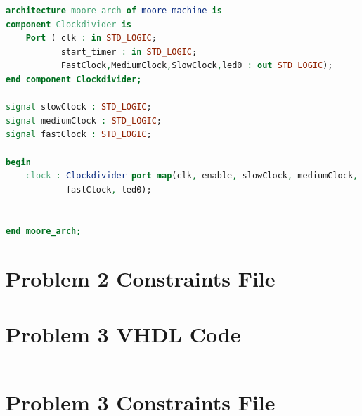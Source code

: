 \documentclass[11pt]{article}
\begin{document}
\begin{appendices}
\begin{lstlisting}[language=VHDL]
architecture moore_arch of moore_machine is
component Clockdivider is
    Port ( clk : in STD_LOGIC;
           start_timer : in STD_LOGIC;
           FastClock,MediumClock,SlowClock,led0 : out STD_LOGIC);
end component Clockdivider;

signal slowClock : STD_LOGIC;
signal mediumClock : STD_LOGIC;
signal fastClock : STD_LOGIC;

begin
    clock : Clockdivider port map(clk, enable, slowClock, mediumClock,
    		fastClock, led0);
    

end moore_arch;
\end{lstlisting}

\section{Problem 2 Constraints File}

\section{Problem 3 VHDL Code}
\begin{lstlisting}[language=VHDL]

\end{lstlisting}

\section{Problem 3 Constraints File}

\end{appendices}
\end{document}
